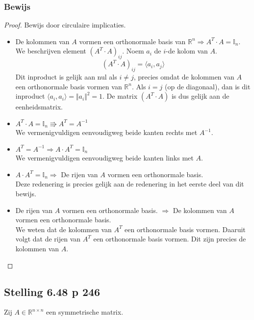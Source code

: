 \documentclass[lineaire_algebra_oplossingen.tex]{subfiles}
\begin{document}
\subsubsection*{Bewijs}
\begin{proof}
Bewijs door circulaire implicaties.
\begin{itemize}
\item
De kolommen van $A$ vormen een orthonormale basis van $\mathbb{R}^n \Rightarrow A^T \cdot A = \mathbb{I}_n$.\\
We beschrijven element $(A^T \cdot A)_{ij}$. Noem $a_i$ de $i$-de kolom van $A$.
\[
(A^T \cdot A)_{ij} = \langle a_i , a_j\rangle
\]
Dit inproduct is gelijk aan nul als $i\neq j$, precies omdat de kolommen van $A$ een orthonormale basis vormen van $\mathbb{R}^n$.
Als $i =j$ (op de diagonaal), dan is dit inproduct $\langle a_i , a_i \rangle = \Vert a_i\Vert^2 = 1$. De matrix $(A^T \cdot A)$ is dus gelijk aan de eenheidsmatrix.

\item
$A^T \cdot A = \mathbb{I}_n \Rrightarrow A^T =A^{-1}$\\
We vermenigvuldigen eenvoudigweg beide kanten rechts met $A^{-1}$.

\item
$A^T =A^{-1} \Rightarrow A \cdot A^T = \mathbb{I}_n$\\
We vermenigvuldigen eenvoudigweg beide kanten links met $A$.

\item
$A \cdot A^T = \mathbb{I}_n \Rightarrow $ De rijen van $A$ vormen een orthonormale basis.\\
Deze redenering is precies gelijk aan de redenering in het eerste deel van dit bewijs.

\item
De rijen van $A$ vormen een orthonormale basis. $\Rightarrow$ De kolommen van $A$ vormen een orthonormale basis.\\
We weten dat de kolommen van $A^T$ een orthonormale basis vormen.
Daaruit volgt dat de rijen van $A^T$ een orthonormale basis vormen.
Dit zijn precies de kolommen van $A$.

\end{itemize}
\end{proof}

\subsection{Stelling 6.48 p 246}
Zij $A\in \mathbb{R}^{n\times n}$ een symmetrische matrix.
\end{document}
